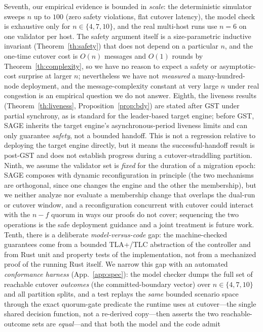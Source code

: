\documentclass[journal]{IEEEtran}
\theoremstyle{definition}
\theoremstyle{remark}
\begin{document}
Seventh, our empirical evidence is bounded in \emph{scale}: the deterministic simulator sweeps
$n$ up to $100$ (zero safety violations, flat cutover latency), the model check is exhaustive
only for $n\in\{4,7,10\}$, and the real multi-host runs use $n{=}6$ on one validator per host. The safety argument itself is a size-parametric
inductive invariant (Theorem~\ref{th:safety}) that does not depend on a particular $n$, and the
one-time cutover cost is $O(n)$ messages and $O(1)$ rounds by Theorem~\ref{th:complexity}, so we
have no reason to expect a safety or asymptotic-cost surprise at larger $n$; nevertheless we have
not \emph{measured} a many-hundred-node deployment, and the message-complexity constant at very
large $n$ under real congestion is an empirical question we do not answer. Eighth, the liveness
results (Theorem~\ref{th:liveness}, Proposition~\ref{prop:bdy}) are stated after GST under partial
synchrony, as is standard for the leader-based target engine; before GST, SAGE inherits the target
engine's asynchronous-period liveness limits and can only guarantee \emph{safety}, not a bounded
handoff. This is not a regression relative to deploying the target engine directly, but it means
the successful-handoff result is post-GST and does not establish progress during a cutover-straddling partition. Ninth, we assume
the validator set is \emph{fixed} for the duration of a migration epoch: SAGE composes with dynamic
reconfiguration in principle (the two mechanisms are orthogonal, since one changes the engine and
the other the membership), but we neither analyze nor evaluate a membership change that overlaps the
dual-run or cutover window, and a reconfiguration concurrent with cutover could interact with the
$n{-}f$ quorum in ways our proofs do not cover; sequencing the two operations is the safe deployment
guidance and a joint treatment is future work. Tenth, there is a deliberate \emph{model-versus-code}
gap: the machine-checked guarantees come from a bounded TLA+/TLC abstraction of the controller and
from Rust unit and property tests of the implementation, not from a mechanized proof of the running
Rust itself. We narrow this gap with an automated \emph{conformance harness} (App.~\ref{app:spec}):
the model checker dumps the full set of reachable cutover \emph{outcomes} (the
committed-boundary vector) over $n\in\{4,7,10\}$ and all partition splits, and a test replays the
\emph{same} bounded scenario space through the exact quorum-gate predicate the runtime uses at
cutover---the single shared decision function, not a re-derived copy---then
asserts the two reachable-outcome sets are \emph{equal}---and that both the model and the code admit
\end{document}
